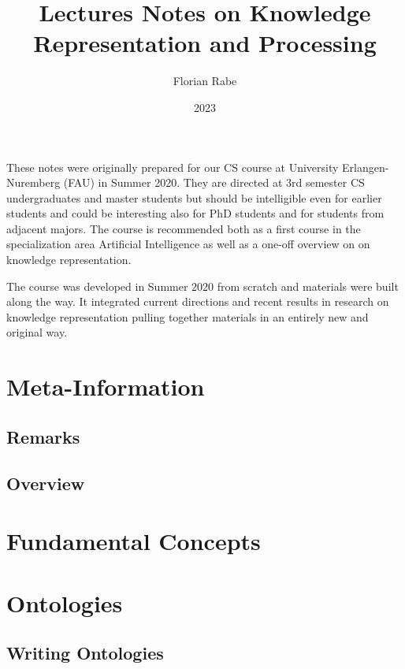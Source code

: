 \documentclass{book}
\title{Lectures Notes on Knowledge Representation and Processing}
\author{Florian Rabe}
\date{2023}
\begin{document}
\maketitle

\bigskip

These notes were originally prepared for our CS course at University Erlangen-Nuremberg (FAU) in Summer 2020.
They are directed at 3rd semester CS undergraduates and master students but should be intelligible even for earlier students and could be interesting also for PhD students and for students from adjacent majors.
The course is recommended both as a first course in the specialization area Artificial Intelligence as well as a one-off overview on on knowledge representation.

The course was developed in Summer 2020 from scratch and materials were built along the way.
It integrated current directions and recent results in research on knowledge representation pulling together materials in an entirely new and original way.

\tableofcontents

\newpage

\setcounter{chapter}{-1}
\chapter{Meta-Information}
 \section{Remarks}
  
\section{Overview}
  

\chapter{Fundamental Concepts}\label{sec:wuv:concepts}
  

\chapter{Ontologies}
 
 \section{Writing Ontologies}\label{sec:onto:write}
   
\end{document}

